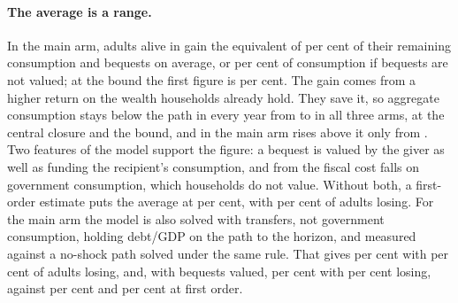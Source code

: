 \paragraph{The average is a range.} In the main arm, adults alive in \genShockYear{} gain the equivalent of \genCohMainDnCentralAvgShort{} per cent of their remaining consumption and bequests on average, or \genCohMainDnCentralNoBeqAvgShort{} per cent of consumption if bequests are not valued; at the bound the first figure is \genCohMainDnBoundAvg{} per cent. The gain comes from a higher return on the wealth households already hold. They save it, so aggregate consumption stays below the path in every year from \genShockYear{} to \genLastFlowYear{} in all three arms, at the central closure and the bound, and in the main arm rises above it only from \genCohMainDnCentralFirstCAbove{}. Two features of the model support the figure: a bequest is valued by the giver as well as funding the recipient's consumption, and from \genDebtRuleYear{} the fiscal cost falls on government consumption, which households do not value. Without both, a first-order estimate puts the average at \genCohMainDnCentralChargedNoBeqAvgRange{} per cent, with \genCohMainDnCentralChargedNoBeqLosingPctRange{} per cent of adults losing. For the main arm the model is also solved with transfers, not government consumption, holding debt/GDP on the path to the horizon, and measured against a no-shock path solved under the same rule. That gives \genCohMainDnfullCentralNoBeqAvgRange{} per cent with \genCohMainDnfullCentralNoBeqLosingPctRange{} per cent of adults losing, and, with bequests valued, \genCohMainDnfullCentralAvgRange{} per cent with \genCohMainDnfullCentralLosingPctRange{} per cent losing, against \genCohMainDnCentralChargedAvgRange{} per cent and \genCohMainDnCentralChargedLosingPctRange{} per cent at first order.

